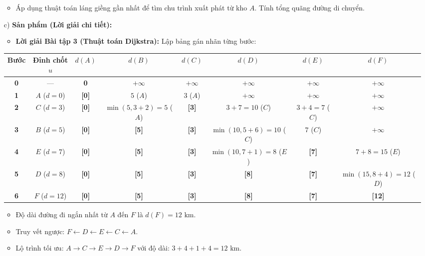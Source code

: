 \documentclass[12pt, a4paper]{article}
\begin{document}
\begin{itemize}[leftmargin=1.2cm]
    \begin{itemize}[leftmargin=0.6cm]
        \item Áp dụng thuật toán láng giềng gần nhất để tìm chu trình xuất phát từ kho $A$. Tính tổng quãng đường di chuyển.
    \end{itemize}

    \item[c)] \textbf{Sản phẩm (Lời giải chi tiết):}
    \begin{itemize}[leftmargin=0.6cm]
        \item \textbf{Lời giải Bài tập 3 (Thuật toán Dijkstra):}
        Lập bảng gán nhãn từng bước:
    \end{itemize}

    \begin{center}
    \begin{tabular}{|c|c|c|c|c|c|c|c|}
    \hline
    \textbf{Bước} & \textbf{Đỉnh chốt $u$} & $d(A)$ & $d(B)$ & $d(C)$ & $d(D)$ & $d(E)$ & $d(F)$ \\ \hline
    \textbf{0} & --- & \textbf{0} & $+\infty$ & $+\infty$ & $+\infty$ & $+\infty$ & $+\infty$ \\ \hline
    \textbf{1} & $A$ ($d=0$) & \textbf{[0]} & $5$ ($A$) & $3$ ($A$) & $+\infty$ & $+\infty$ & $+\infty$ \\ \hline
    \textbf{2} & $C$ ($d=3$) & \textbf{[0]} & $\min(5, 3+2)=5$ ($A$) & \textbf{[3]} & $3+7=10$ ($C$) & $3+4=7$ ($C$) & $+\infty$ \\ \hline
    \textbf{3} & $B$ ($d=5$) & \textbf{[0]} & \textbf{[5]} & \textbf{[3]} & $\min(10, 5+6)=10$ ($C$) & $7$ ($C$) & $+\infty$ \\ \hline
    \textbf{4} & $E$ ($d=7$) & \textbf{[0]} & \textbf{[5]} & \textbf{[3]} & $\min(10, 7+1)=8$ ($E$) & \textbf{[7]} & $7+8=15$ ($E$) \\ \hline
    \textbf{5} & $D$ ($d=8$) & \textbf{[0]} & \textbf{[5]} & \textbf{[3]} & \textbf{[8]} & \textbf{[7]} & $\min(15, 8+4)=12$ ($D$) \\ \hline
    \textbf{6} & $F$ ($d=12$) & \textbf{[0]} & \textbf{[5]} & \textbf{[3]} & \textbf{[8]} & \textbf{[7]} & \textbf{[12]} \\ \hline
    \end{tabular}
    \end{center}

    \begin{itemize}[leftmargin=0.6cm]
        \item Độ dài đường đi ngắn nhất từ $A$ đến $F$ là $d(F) = 12\text{ km}$.
        \item Truy vết ngược: $F \leftarrow D \leftarrow E \leftarrow C \leftarrow A$.
        \item Lộ trình tối ưu: $A \to C \to E \to D \to F$ với độ dài: $3 + 4 + 1 + 4 = 12\text{ km}$.
    \end{itemize}


\end{itemize}
\end{document}
